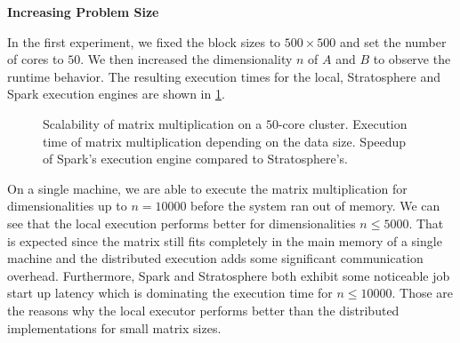 \textbf{Increasing Problem Size}

In the first experiment, we fixed the block sizes to $500 \times 500$ and set the number of cores to $50$.
We then increased the dimensionality $n$ of $A$ and $B$ to observe the runtime behavior.
The resulting execution times for the local, Stratosphere and Spark execution engines are shown in \cref{fig:mmLoadRuntime}.

\begin{figure}[!h]
	\centering
	\begin{subfigure}{\dualpgfwidth}
		\caption{}
		\label{fig:mmLoadRuntime}
	\end{subfigure}
	\begin{subfigure}{\dualpgfwidth}
		\caption{}
		\label{fig:mmSpeedup}
	\end{subfigure}
	\caption{Scalability of matrix multiplication on a $50$-core cluster.  Execution time of matrix multiplication depending on the data size.  Speedup of Spark's execution engine compared to Stratosphere's.}
	\label{fig:mmBenchmark}
\end{figure}

On a single machine, we are able to execute the matrix multiplication for dimensionalities up to $n=10000$ before the system ran out of memory.
We can see that the local execution performs better for dimensionalities $n \le 5000$.
That is expected since the matrix still fits completely in the main memory of a single machine and the distributed execution adds some significant communication overhead.
Furthermore, Spark and Stratosphere both exhibit some noticeable job start up latency which is dominating the execution time for $n\le 10000$.
Those are the reasons why the local executor performs better than the distributed implementations for small matrix sizes.

